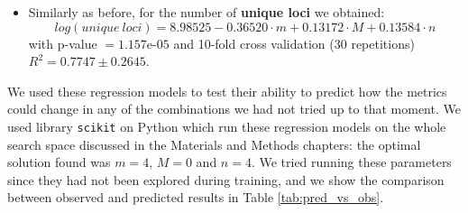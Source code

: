 \documentclass[a4paper, 12pt]{report}
\begin{document}
\begin{itemize}
	\begin{equation}
		log(SNPs) = 9.08393 -0.3486 \cdot m + 0.19492 \cdot M + 0.19022 \cdot n
	\end{equation}
	\item Similarly as before, for the number of \textbf{unique loci} we obtained:
	\begin{equation}
		log(unique \ loci) = 8.98525 -0.36520 \cdot m + 0.13172 \cdot M + 0.13584 \cdot n
	\end{equation}
	with p-value $= 1.157\text{e-}05$ and 10-fold cross validation (30 repetitions) $R^2 = 0.7747 \pm 0.2645$.
\end{itemize}
\vspace{-1.5em}
We used these regression models to test their ability to predict how the metrics could change in any of the combinations we had not tried up to that moment. We used library \texttt{scikit} on Python which run these regression models on the whole search space discussed in the Materials and Methods chapters: the optimal solution found was $m = 4$, $M = 0$ and $n = 4$. We tried running these parameters since they had not been explored during training, and we show the comparison between  observed and predicted results in Table \ref{tab:pred_vs_obs}.
\end{document}
